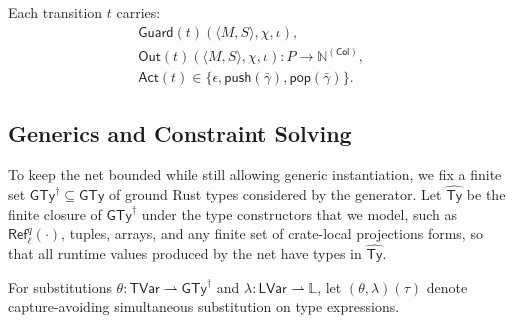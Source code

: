 \documentclass[sigconf]{acmart}
\newtheorem{definition}{Definition}
\begin{document}
Each transition $t$ carries:
\begin{align*}
    & \mathsf{Guard}(t)(\langle M,S\rangle,\chi,\iota),\qquad \\
    & \mathsf{Out}(t)(\langle M,S\rangle,\chi,\iota):P\to \mathbb{N}^{(\mathsf{Col})},\qquad \\
    & \mathsf{Act}(t)\in\{\epsilon,\mathsf{push}(\bar\gamma),\mathsf{pop}(\bar\gamma)\}.
\end{align*}



\subsection{Generics and Constraint Solving}
\label{sec:method:generics}

To keep the net bounded while still allowing generic instantiation, we fix a finite set $\mathsf{GTy}^{\dagger}\subseteq \mathsf{GTy}$ of ground Rust types considered by the generator.
Let $\widehat{\mathsf{Ty}}$ be the finite closure of $\mathsf{GTy}^{\dagger}$ under the
type constructors that we model, such as $\mathsf{Ref}^q_{\ell}(\cdot)$, tuples, arrays, and any finite set of crate-local projections forms, so that all runtime values produced by the net have types in $\widehat{\mathsf{Ty}}$.

For substitutions $\theta:\mathsf{TVar}\rightharpoonup \mathsf{GTy}^{\dagger}$ and
$\lambda:\mathsf{LVar}\rightharpoonup \mathbb{L}$, let $(\theta,\lambda)(\tau)$ denote capture-avoiding simultaneous substitution on type expressions.
\end{document}

